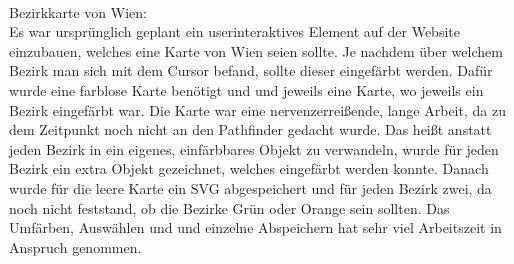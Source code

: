 \leavevmode \\
Bezirkkarte von Wien:
\leavevmode \\
Es war ursprünglich geplant ein userinteraktives Element auf der Website einzubauen, welches eine Karte von Wien seien sollte. Je nachdem über welchem Bezirk man sich mit dem Cursor befand, sollte dieser eingefärbt werden. Dafür wurde eine farblose Karte benötigt und und jeweils eine Karte, wo jeweils ein Bezirk eingefärbt war. Die Karte war eine nervenzerreißende, lange Arbeit, da zu dem Zeitpunkt noch nicht an den Pathfinder gedacht wurde. Das heißt anstatt jeden Bezirk in ein eigenes, einfärbbares Objekt zu verwandeln, wurde für jeden Bezirk ein extra Objekt gezeichnet, welches eingefärbt werden konnte. Danach wurde für die leere Karte ein SVG abgespeichert und für jeden Bezirk zwei, da noch nicht feststand, ob die Bezirke Grün oder Orange sein sollten. Das Umfärben, Auswählen und und einzelne Abspeichern hat sehr viel Arbeitszeit in Anspruch genommen.